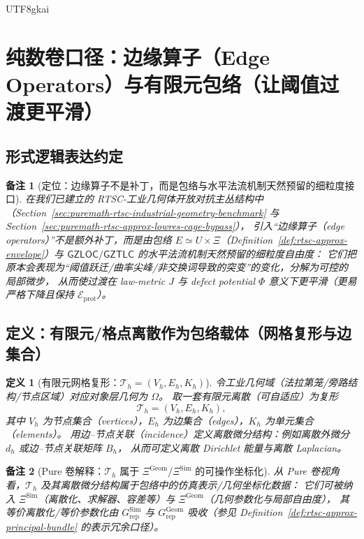 \documentclass[12pt]{article}
\newtheorem{definition}{定义}[section]
\newtheorem{remark}{备注}[section]
\newcommand{\GZLOC}{\ensuremath{\mathsf{GZLOC}}}
\newcommand{\GZTLC}{\ensuremath{\mathsf{GZTLC}}}
\newcommand{\RTSC}{\textsf{RTSC}}
\begin{document}
\begin{CJK*}{UTF8}{gkai}
\clearpage
\section{纯数卷口径：边缘算子（Edge Operators）与有限元包络（让阈值过渡更平滑）}
\label{sec:puremath-edge-operators-fem-envelope}

\subsection{形式逻辑表达约定}

\begin{remark}[定位：边缘算子不是补丁，而是包络与水平法流机制天然预留的细粒度接口]
在我们已建立的 \RTSC{}-工业几何体开放对抗主丛结构中（Section~\ref{sec:puremath-rtsc-industrial-geometry-benchmark} 与 Section~\ref{sec:puremath-rtsc-approx-lowres-cage-bypass}），
引入“边缘算子（edge operators）”不是额外补丁，而是由包络 $E\simeq U\times\Xi$（Definition~\ref{def:rtsc-approx-envelope}）与 $\GZLOC/\GZTLC$
  的水平法流机制天然预留的细粒度自由度：
它们把原本会表现为“阈值跃迁/曲率尖峰/非交换词导致的突变”的变化，分解为可控的局部微步，
从而使过渡在 law-metric $J$ 与 defect potential $\Phi$ 意义下更平滑（更易严格下降且保持 $\mathcal{E}_{\mathrm{prot}}$）。
\end{remark}

\subsection{定义：有限元/格点离散作为包络载体（网格复形与边集合）}

\begin{definition}[有限元网格复形：$\mathcal{T}_h=(V_h,E_h,K_h)$]
\label{def:fem-mesh-complex}
令工业几何域（法拉第笼/旁路结构/节点区域）对应对象层几何为 $\Omega$。
取一套有限元离散（可自适应）为复形
\[
\mathcal{T}_h=(V_h,E_h,K_h),
\]
其中 $V_h$ 为节点集合（vertices），$E_h$ 为边集合（edges），$K_h$ 为单元集合（elements）。
用边--节点关联（incidence）定义离散微分结构：例如离散外微分 $d_h$ 或边--节点关联矩阵 $B_h$，
从而可定义离散 Dirichlet 能量与离散 Laplacian。
\end{definition}

\begin{remark}[Pure 卷解释：$\mathcal{T}_h$ 属于 $\Xi^{\mathrm{Geom}}/\Xi^{\mathrm{Sim}}$ 的可操作坐标化]
从 Pure 卷视角看，$\mathcal{T}_h$ 及其离散微分结构属于包络中的仿真表示/几何坐标化数据：
它们可被纳入 $\Xi^{\mathrm{Sim}}$（离散化、求解器、容差等）与 $\Xi^{\mathrm{Geom}}$（几何参数化与局部自由度），
其等价离散化/等价参数化由 $G_{\mathrm{rep}}^{\mathrm{Sim}}$ 与 $G_{\mathrm{rep}}^{\mathrm{Geom}}$ 吸收（参见 Definition~\ref{def:rtsc-approx-principal-bundle} 的表示冗余口径）。
\end{remark}


\end{CJK*}
\end{document}
